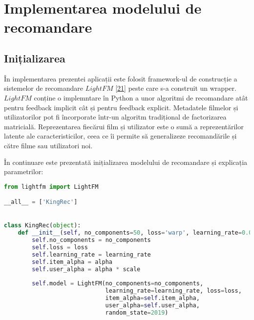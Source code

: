 \section{Implementarea modelului de recomandare}
\subsection{Inițializarea}
În implementarea prezentei aplicații este folosit framework-ul de construcție a sistemelor de recomandare $LightFM$ \hyperlink{lightfm}{[21]} peste care s-a construit un wrapper. 
$LightFM$ conține o implemntare în Python a unor algoritmi de recomandare atât pentru feedback implicit cât și pentru feedback explicit. Metadatele filmelor și utilizatorilor pot fi încorporate într-un algoritm tradițional de factorizarea matricială. Reprezentarea fiecărui film și utilizator este o sumă a reprezentărilor latente ale caracteristicilor, ceea ce îi permite să generalizeze recomandările și către filme sau utilizatori noi.

În continuare este prezentată inițializarea modelului de recomandare și explicația parametrilor:
\begin{lstlisting}[language=Python, caption=\textit{Definirea modelului de recomandare}]
from lightfm import LightFM

__all__ = ['KingRec']


class KingRec(object):
    def __init__(self, no_components=50, loss='warp', learning_rate=0.05, alpha=0.02, scale=0.07):
        self.no_components = no_components
        self.loss = loss
        self.learning_rate = learning_rate
        self.item_alpha = alpha
        self.user_alpha = alpha * scale
        
        self.model = LightFM(no_components=no_components, 
        					 learning_rate=learning_rate, loss=loss,
                             item_alpha=self.item_alpha, 
                             user_alpha=self.user_alpha, 
                             random_state=2019)                       
\end{lstlisting}

